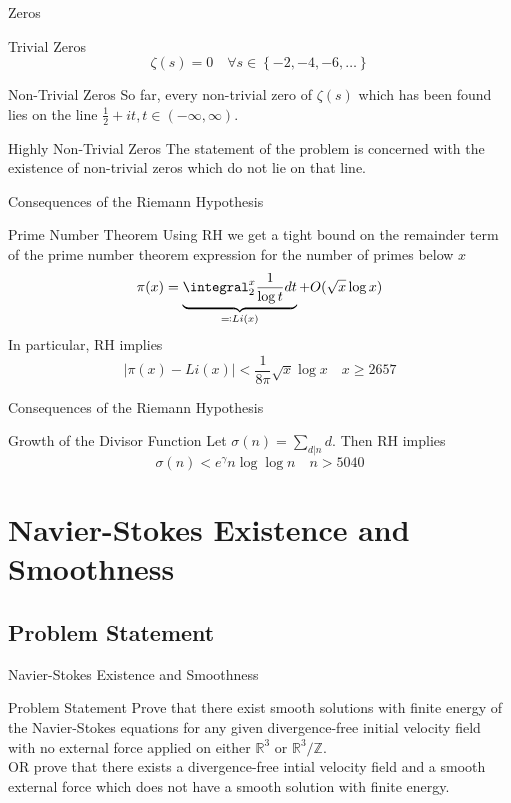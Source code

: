 \documentclass{beamer}
\newcommand{\Real}{\mathbb{R}}
\newcommand{\Integer}{\mathbb{Z}}
\begin{document}
  \begin{frame}{Zeros}
      \pause
      \begin{block}{Trivial Zeros}
          $$
          \zeta(s) = 0 \quad \forall s \in \left\{-2, -4, -6, \ldots \right\}
          $$
      \end{block}
      \pause
      \begin{block}{Non-Trivial Zeros}
          So far, every non-trivial zero of $\zeta(s)$ which has been found
          lies on the line $\frac{1}{2} + it, t \in (-\infty, \infty)$.
      \end{block}
      \pause
      \begin{block}{Highly Non-Trivial Zeros}
          The statement of the problem is concerned with the existence of
          non-trivial zeros which do not lie on that line.
      \end{block}
  \end{frame}
  \begin{frame}{Consequences of the Riemann Hypothesis}
      \pause
      \begin{block}{Prime Number Theorem}
          Using RH we get a tight bound on the remainder term of the prime
          number theorem expression for the number of primes below $x$
          $$
          \pi(x) = \underbrace{\integral_{2}^{x} \frac{1}{\log t}
          dt}_{\eqqcolon Li(x)} + O(\sqrt{x}\log x)
          $$\pause
          In particular, RH implies
          $$
          \left| \pi(x) - Li(x) \right| < \frac{1}{8\pi}\sqrt{x}\log x \quad
          x \ge 2657
          $$
      \end{block}
  \end{frame}
  \begin{frame}{Consequences of the Riemann Hypothesis}
      \pause
      \begin{block}{Growth of the Divisor Function}
          Let $\sigma(n) = \sum_{d | n}d$. Then RH implies
          $$
          \sigma(n) < e^{\gamma} n \log\log n \quad n > 5040
          $$
      \end{block}
  \end{frame}

  \section{Navier-Stokes Existence and Smoothness}
  \subsection{Problem Statement}
  \begin{frame}{Navier-Stokes Existence and Smoothness}
      \begin{block}{Problem Statement}
          Prove that there exist smooth solutions with finite energy of the
          Navier-Stokes equations for any given divergence-free initial
          velocity field with no external force applied on either $\Real^3$
          or $\Real^3/\Integer$.\pause\\
          OR prove that there exists a divergence-free
          intial velocity field and a smooth external force which does not
          have a smooth solution with finite energy.
      \end{block}
  \end{frame}
\end{document}
